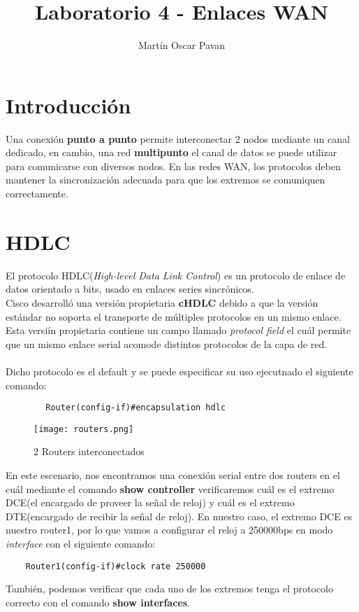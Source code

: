 \documentclass{article}
\title{Laboratorio 4 - Enlaces WAN}
\author{Martín Oscar Pavan}
\begin{document}
\maketitle
\section{Introducción}
Una conexión \textbf{punto a punto} permite interconectar 2 nodos mediante un canal dedicado, en cambio, una red \textbf{multipunto} el canal de datos se puede utilizar para comunicarse con diversos nodos. En las redes WAN, los protocolos deben mantener la sincronización adecuada para que los extremos se comuniquen correctamente.
\section{HDLC}
El protocolo HDLC(\textit{High-level Data Link Control}) es un protocolo de enlace de datos orientado a bits, usado en enlaces series sincrónicos.
\\Cisco desarrolló una versión propietaria \textbf{cHDLC} debido a que la versión estándar no soporta el transporte de múltiples protocolos en un mismo enlace. Esta versiín propietaria contiene un campo llamado \textit{protocol field} el cuál permite que un mismo enlace serial acomode distintos protocolos de la capa de red.
\\\\
Dicho protocolo es el default y se puede especificar su uso ejecutnado el siguiente comando:

\begin{lstlisting}
        Router(config-if)#encapsulation hdlc
\end{lstlisting}
\begin{figure}[H]
    \centering
    \texttt{[image: routers.png]}
    \caption{2 Routers interconectados}
    \label{fig:enter-label}
\end{figure}
En este escenario, nos encontramos una conexión serial entre dos routers en el cuál mediante el comando \textbf{show controller} verificaremos cuál es el extremo DCE(el encargado de proveer la señal de reloj) y cuál es el extremo DTE(encargado de recibir la señal de reloj). En nuestro caso, el extremo DCE es nuestro router1, por lo que vamos a configurar el reloj a 250000bps en modo \textit{interface} con el siguiente comando:
\begin{lstlisting}
    Router1(config-if)#clock rate 250000
\end{lstlisting}
También, podemos verificar que cada uno de los extremos tenga el protocolo correcto con el comando \textbf{show interfaces}.
\end{document}
